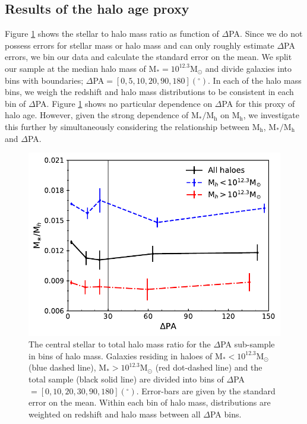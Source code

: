 \subsection{Results of the halo age proxy}
Figure \ref{fig:2d_ratio} shows the stellar to halo mass ratio as function of $\Delta$PA. Since we do not possess errors for stellar mass or halo mass and can only roughly estimate $\Delta$PA errors, we bin our data and calculate the standard error on the mean. We split our sample at the median halo mass of $\mathrm{M_{\ast} = 10^{12.3} M_{\odot}}$ and divide galaxies into bins with boundaries; $\Delta$PA$ = [0,5,10,20,90,180] (^{\circ})$. In each of the halo mass bins, we weigh the redshift and halo mass distributions to be consistent in each bin of $\Delta$PA. Figure \ref{fig:2d_ratio} shows no particular dependence on $\Delta$PA for this proxy of halo age. However, given the strong dependence of $\mathrm{M_{\ast}/M_{h}}$ on $\mathrm{M_{h}}$, we investigate this further by simultaneously considering the relationship between $\mathrm{M_{h}}$, $\mathrm{M_{\ast}/M_{h}}$ and $\Delta$PA. 

\begin{figure}
    \centering
	\includegraphics[width=0.8\linewidth]{thesis/latex/halo_assembly_manga/stel_halo_ratio_bin0_10_20_30_90.pdf}
    \caption[The central stellar to total halo mass ratio for the $\Delta$PA sub-sample.]{The central stellar to total halo mass ratio for the $\Delta$PA sub-sample in bins of halo mass. Galaxies residing in haloes of $\mathrm{M_{\ast} < 10^{12.3} M_{\odot}}$ (blue dashed line), $\mathrm{M_{\ast} > 10^{12.3}M_{\odot}}$ (red dot-dashed line) and the total sample (black solid line) are divided into bins of $\Delta$PA$ = [0,10,20,30,90,180] (^{\circ})$. Error-bars are given by the standard error on the mean. Within each bin of halo mass, distributions are weighted on redshift and halo mass between all $\Delta$PA bins.}
    \label{fig:2d_ratio}
\end{figure}

